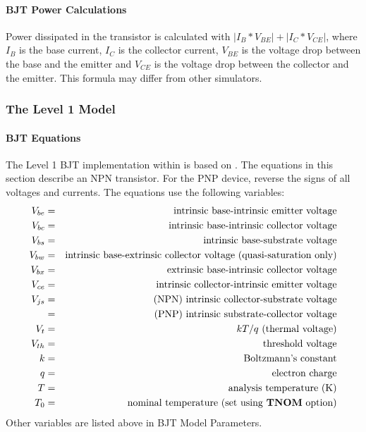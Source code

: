 \paragraph{BJT Power Calculations}
Power dissipated in the transistor is calculated with
$|I_{B}*V_{BE}|+|I_{C}*V_{CE}|$, where $I_{B}$ is the base current, $I_{C}$ is
the collector current, $V_{BE}$ is the voltage drop between the base and the
emitter and $V_{CE}$ is the voltage drop between the collector and the emitter.
This formula may differ from other simulators.

\subsubsection{The Level 1 Model}
\paragraph{BJT Equations}\label{bjt_equations}
The Level 1 BJT implementation within \Xyce{} is based on \cite{Fjeldly:1998}.
The equations in this section describe an NPN transistor. For the PNP device,
reverse the signs of all voltages and currents.  The equations use the
following variables:
\begin{eqnarray*}
V_{be} & = & \mbox{intrinsic base-intrinsic emitter voltage} \\
V_{bc} & = & \mbox{intrinsic base-intrinsic collector voltage} \\
V_{bs} & = & \mbox{intrinsic base-substrate voltage} \\
V_{bw} & = & \mbox{intrinsic base-extrinsic collector voltage
(quasi-saturation only)} \\
V_{bx} & = & \mbox{extrinsic base-intrinsic collector voltage} \\
V_{ce} & = & \mbox{intrinsic collector-intrinsic emitter voltage} \\
V_{js} & = & \mbox{(NPN) intrinsic collector-substrate voltage} \\
&        = & \mbox{(PNP) intrinsic substrate-collector voltage} \\
V_{t}  & = & \mbox{$kT/q$ (thermal voltage)} \\
V_{th} & = & \mbox{threshold voltage} \\
k      & = & \mbox{Boltzmann's constant} \\
q      & = & \mbox{electron charge} \\
T      & = & \mbox{analysis temperature (K)} \\
T_{0}  & = & \mbox{nominal temperature (set using \textrm{\textbf{TNOM}} option)}
\end{eqnarray*}
Other variables are listed above in BJT Model Parameters.

